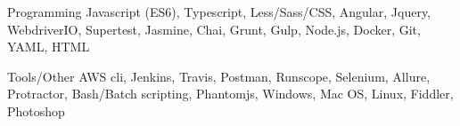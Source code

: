 

\begin{cvskills}

  \cvskill
    {Programming} %
    {Javascript (ES6), Typescript, Less/Sass/CSS, Angular, Jquery, WebdriverIO, Supertest, Jasmine, Chai, Grunt, Gulp, Node.js, Docker, Git, YAML, HTML} %

  \cvskill
    {Tools/Other} %
    {AWS cli, Jenkins, Travis, Postman, Runscope, Selenium, Allure, Protractor, Bash/Batch scripting, Phantomjs, Windows, Mac OS, Linux, Fiddler, Photoshop} %

\end{cvskills}
